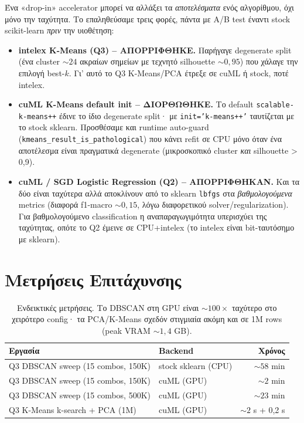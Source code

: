 \documentclass[12pt,a4paper,twoside]{book}
\begin{document}
Ένα «drop-in» accelerator μπορεί να αλλάξει τα \emph{αποτελέσματα} ενός
αλγορίθμου, όχι μόνο την ταχύτητα. Το επαληθεύσαμε τρεις φορές, πάντα με
A/B test έναντι stock scikit-learn \emph{πριν} την υιοθέτηση:
\begin{itemize}
    \item \textbf{intelex K-Means (Q3) -- ΑΠΟΡΡΙΦΘΗΚΕ.} Παρήγαγε
    degenerate split (ένα cluster \(\sim 24\) ακραίων σημείων με τεχνητό
    silhouette \(\sim 0{,}95\)) που χάλαγε την επιλογή best-\(k\). Γι' αυτό
    το Q3 K-Means/PCA έτρεξε σε cuML ή stock, ποτέ intelex.
    \item \textbf{cuML K-Means default init -- ΔΙΟΡΘΩΘΗΚΕ.} Το default
    \texttt{scalable-k-means++} έδινε το ίδιο degenerate split· με
    \texttt{init='k-means++'} ταυτίζεται με το stock sklearn. Προσθέσαμε
    και runtime auto-guard (\texttt{kmeans\_result\_is\_pathological}) που
    κάνει refit σε CPU μόνο όταν ένα αποτέλεσμα είναι πραγματικά degenerate
    (μικροσκοπικό cluster \emph{και} silhouette > 0,9).
    \item \textbf{cuML / SGD Logistic Regression (Q2) -- ΑΠΟΡΡΙΦΘΗΚΑΝ.} Και
    τα δύο είναι ταχύτερα αλλά αποκλίνουν από το sklearn \texttt{lbfgs}
    στα \emph{βαθμολογούμενα} metrics (διαφορά f1-macro \(\sim 0{,}15\),
    λόγω διαφορετικού solver/regularization). Για βαθμολογούμενο
    classification η αναπαραγωγιμότητα υπερισχύει της ταχύτητας, οπότε το
    Q2 έμεινε σε CPU+intelex (το intelex είναι bit-ταυτόσημο με sklearn).
\end{itemize}

\section{Μετρήσεις Επιτάχυνσης}

\begin{table}[H]
    \centering
    \begin{tabular}{llr}
        \toprule
        \textbf{Εργασία} & \textbf{Backend} & \textbf{Χρόνος} \\
        \midrule
        Q3 DBSCAN sweep (15 combos, 150K) & stock sklearn (CPU) & \(\sim 58\) min \\
        Q3 DBSCAN sweep (15 combos, 150K) & cuML (GPU)          & \(\sim 2\) min \\
        Q3 DBSCAN sweep (15 combos, 500K) & cuML (GPU)          & \(\sim 23\) min \\
        Q3 K-Means k-search + PCA (1M)    & cuML (GPU)          & \(\sim 2\) s + 0,2 s \\
        \bottomrule
    \end{tabular}
    \caption{Ενδεικτικές μετρήσεις. Το DBSCAN στη GPU είναι
    \(\sim 100\times\) ταχύτερο στο χειρότερο config· τα PCA/K-Means
    σχεδόν στιγμιαία ακόμη και σε 1M rows (peak VRAM \(\sim 1{,}4\) GB).}
    \label{tab:gpu_timings}
\end{table}
\end{document}
